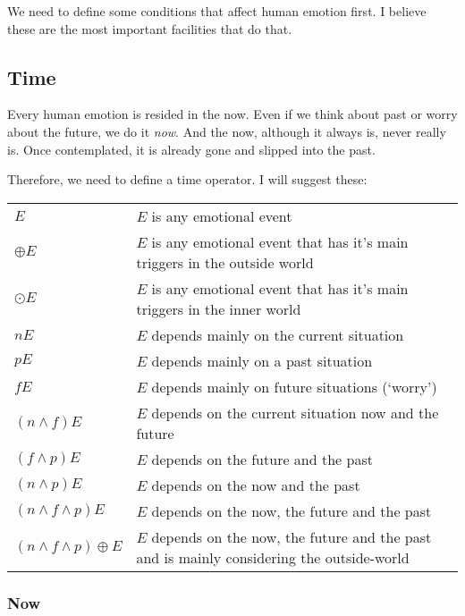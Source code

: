 \documentclass{scrartcl}
\begin{document}
We need to define some conditions that affect human emotion first. I believe these are the most important facilities that
do that.

\subsection{Time}

Every human emotion is resided in the now. Even if we think about past or worry about the future, we do it \textit{now}.
And the now, although it always is, never really is. Once contemplated, it is already gone and slipped into the past.

Therefore, we need to define a time operator. I will suggest these:

\begin{tabular}{l|l}
	$E$           & $E$ is any emotional event \\
	$\oplus E$           & $E$ is any emotional event that has it's main triggers in the outside world\footnotemark\\
	$\odot E$           & $E$ is any emotional event that has it's main triggers in the inner world\footnotemark\\
	$n E$ & $E$ depends mainly on the current situation \\
	$p E$ & $E$ depends mainly on a past situation \\
	$f E$ & $E$ depends mainly on future situations (`worry') \\
	$(n \wedge f) E$ & $E$ depends on the current situation now and the future \\
	$(f \wedge p) E$ & $E$ depends on the future and the past \\
	$(n \wedge p) E$ & $E$ depends on the now and the past \\
	$(n \wedge f \wedge p) E$ & $E$ depends on the now, the future and the past \\
	$(n \wedge f \wedge p) \oplus E$ & $E$ depends on the now, the future and the past and is mainly considering the outside-world
\end{tabular}


\subsubsection{Now}
\end{document}
